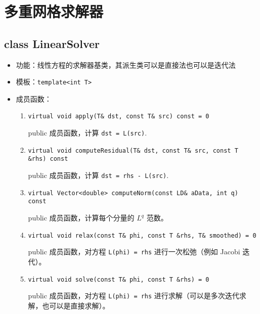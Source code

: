 \documentclass[cn, bibend=bibtex]{elegantpaper}
\theoremstyle{plain}
\begin{document}


\section{多重网格求解器}

\subsection{class LinearSolver}

\begin{itemize}
  \item 功能：线性方程的求解器基类，其派生类可以是直接法也可以是迭代法
  \item 模板：\lstinline|template<int T>|

  \item 成员函数：
  \begin{enumerate}
    \item \lstinline|virtual void apply(T& dst, const T& src) const = 0|

    public 成员函数，计算 \lstinline|dst = L(src)|.
  
    \item \lstinline|virtual void computeResidual(T& dst, const T& src, const T &rhs) const|

    public 成员函数，计算 \lstinline|dst = rhs - L(src)|.

    \item \lstinline|virtual Vector<double> computeNorm(const LD& aData, int q) const|

    public 成员函数，计算每个分量的 $L^q$ 范数。

    \item \lstinline|virtual void relax(const T& phi, const T &rhs, T& smoothed) = 0|
    
    public 成员函数，对方程 \lstinline|L(phi) = rhs| 进行一次松弛（例如 Jacobi 迭代）。

    \item \lstinline|virtual void solve(const T& phi, const T &rhs) = 0|
    
    public 成员函数，对方程 \lstinline|L(phi) = rhs| 进行求解（可以是多次迭代求解，也可以是直接求解）。
  \end{enumerate}
\end{itemize}
\end{document}
